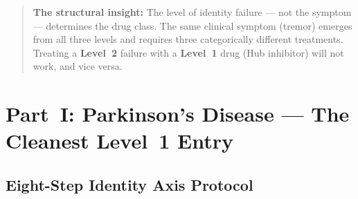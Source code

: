 \documentclass[12pt,a4paper]{article}
\newcommand{\Lev}[1]{\textbf{Level~#1}}
\begin{document}
\begin{quote}
\textbf{The structural insight:} The level of identity failure ---
not the symptom --- determines the drug class. The same clinical
symptom (tremor) emerges from all three levels and requires three
categorically different treatments. Treating a \Lev{2} failure with
a \Lev{1} drug (Hub inhibitor) will not work, and vice versa.
\end{quote}

\section{Part~I: Parkinson's Disease --- The Cleanest Level~1 Entry}

\subsection{Eight-Step Identity Axis Protocol}
\end{document}

